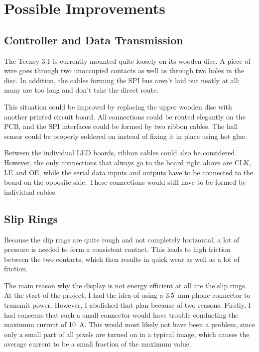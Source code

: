 \documentclass[a4paper, 11pt, titlepage]{report}
\begin{document}
\section{Possible Improvements}

\subsection{Controller and Data Transmission}

The Teensy 3.1 is currently mounted quite loosely on its wooden disc. A piece of wire goes through
two unoccupied contacts as well as through two holes in the disc. In addition, the cables forming
the SPI bus aren't laid out neatly at all; many are too long and don't take the direct route.

This situation could be improved by replacing the upper wooden disc with another printed circuit
board. All connections could be routed elegantly on the PCB, and the SPI interfaces could be
formed by two ribbon cables. The hall sensor could be properly soldered on instead of fixing it in
place using hot glue.

Between the individual LED boards, ribbon cables could also be considered. However, the only
connections that always go to the board right above are CLK, LE and OE, while the serial data
inputs and outputs have to be connected to the board on the opposite side. These connections would
still have to be formed by individual cables.


\subsection{Slip Rings}

Because the slip rings are quite rough and not completely horizontal, a lot of pressure is needed
to form a consistent contact. This leads to high friction between the two contacts, which then
results in quick wear as well as a lot of friction.

The main reason why the display is not energy efficient at all are the slip rings. At the start of
the project, I had the idea of using a \SI{3.5}{\milli\meter} phone connector to transmit power.
However, I abolished that plan because of two reasons. Firstly, I had concerns that such a small
connector would have trouble conducting the maximum current of \SI{10}{\ampere}. This would most
likely not have been a problem, since only a small part of all pixels are turned on in a typical
image, which causes the average current to be a small fraction of the maximum value.
\end{document}
